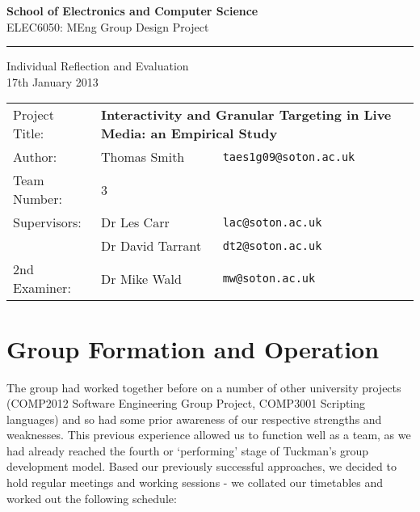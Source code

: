 
\usepackage{endnotes}
\renewcommand\notesname{Links}
\usepackage{enumitem}
\usepackage{graphicx}




\vspace*{0.5cm}
\begin{center}
	\textbf{\large{School of Electronics and Computer Science}}\\
	\large{ELEC6050: MEng Group Design Project}\\[0.9cm]

	\hrule

	Individual Reflection and Evaluation \\
	\normalsize{17th January 2013}
	\vspace{0.5cm}
\end{center}

\begin{center}
	\begin{tabularx}{0.78\textwidth}{X l l}
		Project Title: & \multicolumn{2}{p{7.7cm}}{\textbf{Interactivity and Granular Targeting in Live Media: an Empirical Study}} \\[0.7ex]
		Author: & Thomas Smith & \texttt{taes1g09@soton.ac.uk} \\[0.7ex]
		Team Number: & \multicolumn{2}{l}{3} \\[0.7ex]
		Supervisors: & Dr Les Carr & \texttt{lac@soton.ac.uk} \\
					 & Dr David Tarrant & \texttt{dt2@soton.ac.uk} \\[0.7ex]
		2nd Examiner: & Dr Mike Wald & \texttt{mw@soton.ac.uk} \\[0.5cm]
	\end{tabularx}

\end{center}

\section*{Group Formation and Operation}

The group had worked together before on a number of other university projects (COMP2012 Software Engineering Group Project, COMP3001 Scripting languages) and so had some prior awareness of our respective strengths and weaknesses.
This previous experience allowed us to function well as a team, as we had already reached the fourth or `performing' stage of Tuckman's group development model. Based our previously successful approaches, we decided to hold regular meetings and working sessions - we collated our timetables and worked out the following schedule:

